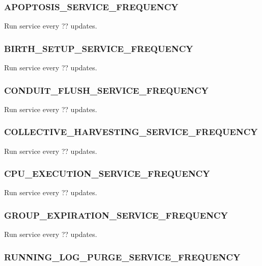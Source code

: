 \subsubsection{APOPTOSIS\_SERVICE\_FREQUENCY}


Run service every ?? updates.

\subsubsection{BIRTH\_SETUP\_SERVICE\_FREQUENCY}


Run service every ?? updates.

\subsubsection{CONDUIT\_FLUSH\_SERVICE\_FREQUENCY}


Run service every ?? updates.

\subsubsection{COLLECTIVE\_HARVESTING\_SERVICE\_FREQUENCY}


Run service every ?? updates.

\subsubsection{CPU\_EXECUTION\_SERVICE\_FREQUENCY}


Run service every ?? updates.

\subsubsection{GROUP\_EXPIRATION\_SERVICE\_FREQUENCY}


Run service every ?? updates.

\subsubsection{RUNNING\_LOG\_PURGE\_SERVICE\_FREQUENCY}


